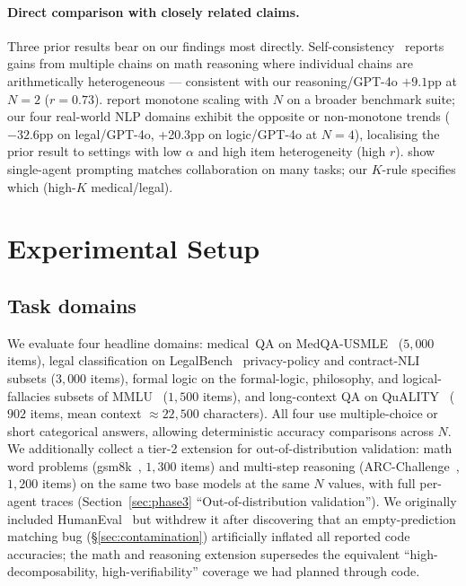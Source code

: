 \documentclass{article}
\begin{document}
\paragraph{Direct comparison with closely related claims.} Three prior results bear on our findings most directly. Self-consistency~\citep{wang2023selfconsistency} reports gains from multiple chains on math reasoning where individual chains are arithmetically heterogeneous --- consistent with our reasoning/GPT-4o $+9.1$pp at $N{=}2$ ($r{=}0.73$). \citet{li2024moreagents} report monotone scaling with $N$ on a broader benchmark suite; our four real-world NLP domains exhibit the opposite or non-monotone trends ($-32.6$pp on legal/GPT-4o, +20.3pp on logic/GPT-4o at $N{=}4$), localising the prior result to settings with low $\alpha$ and high item heterogeneity (high $r$). \citet{wang2023solo} show single-agent prompting matches collaboration on many tasks; our $K$-rule specifies which (high-$K$ medical/legal).


\section{Experimental Setup}
\label{sec:experiments}

\subsection{Task domains}

We evaluate four headline domains: medical~QA on MedQA-USMLE~\citep{jin2021medqa} ($5{,}000$ items), legal classification on LegalBench~\citep{guha2023legalbench} privacy-policy and contract-NLI subsets ($3{,}000$ items), formal logic on the formal-logic, philosophy, and logical-fallacies subsets of MMLU~\citep{hendrycks2021mmlu} ($1{,}500$ items), and long-context QA on QuALITY~\citep{pang2022quality} ($902$ items, mean context $\approx$$22{,}500$ characters). All four use multiple-choice or short categorical answers, allowing deterministic accuracy comparisons across $N$. We additionally collect a tier-2 extension for out-of-distribution validation: math word problems (gsm8k~\citep{cobbe2021gsm8k}, $1{,}300$ items) and multi-step reasoning (ARC-Challenge~\citep{clark2018arc}, $1{,}200$ items) on the same two base models at the same $N$ values, with full per-agent traces (Section~\ref{sec:phase3} ``Out-of-distribution validation''). We originally included HumanEval~\citep{chen2021humaneval} but withdrew it after discovering that an empty-prediction matching bug (\S\ref{sec:contamination}) artificially inflated all reported code accuracies; the math and reasoning extension supersedes the equivalent ``high-decomposability, high-verifiability'' coverage we had planned through code.
\end{document}
